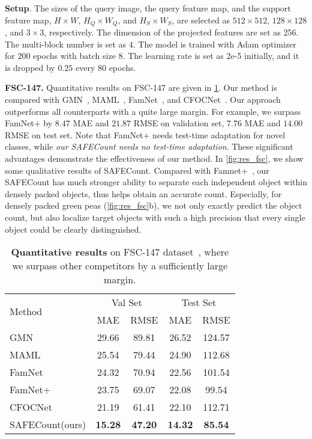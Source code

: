 \documentclass[10pt,twocolumn,letterpaper]{article}
\newcommand{\method}{SAFECount\xspace}
\begin{document}
\vspace{2pt}\noindent \textbf{Setup}. The sizes of the query image, the query feature map, and the support feature map, $H \times W$, $H_Q \times W_Q$, and $H_S \times W_S$, are selected as $512 \times 512$, $128 \times 128$, and $3 \times 3$, respectively. The dimension of the projected features are set as 256. The multi-block number is set as $4$. The model is trained with Adam optimizer~\cite{adam} for $200$ epochs with batch size $8$. The learning rate is set as 2e-5 initially, and it is dropped by $0.25$ every $80$ epochs. 

\vspace{2pt}\noindent \textbf{FSC-147.}  Quantitative results on FSC-147 are given in \cref{tab:res_fsc_147}. Our method is compared with GMN~\cite{gmn}, MAML~\cite{maml}, FamNet~\cite{famnet}, and CFOCNet~\cite{cfocnet}. Our approach outperforms all counterparts with a quite large margin. For example, we surpass FamNet+ by $8.47$ MAE and $21.87$ RMSE on validation set, $7.76$ MAE and $14.00$ RMSE on test set. Note that FamNet+ needs test-time adaptation for novel classes, while \textit{our \method needs no test-time adaptation}. These significant advantages demonstrate the effectiveness of our method. In \cref{fig:res_fsc}, we show some qualitative results of \method. Compared with Famnet+~\cite{famnet}, our \method has much stronger ability to separate each independent object within densely packed objects, thus helps obtain an accurate count. Especially, for densely packed green peas (\cref{fig:res_fsc}b), we not only exactly predict the object count, but also localize target objects with such a high precision that every single object could be clearly distinguished. 


\begin{table}[tb]
\caption{
    \textbf{Quantitative results} on FSC-147 dataset~\cite{famnet}, where we surpass other competitors by a sufficiently large margin. 
}
\setlength\tabcolsep{8pt}
\centering
\scriptsize
\begin{threeparttable}
\begin{tabular}{lcccc}
\toprule
\multirow{2}{*}{Method}
& \multicolumn{2}{c}{Val Set} & \multicolumn{2}{c}{Test Set} \\
\cmidrule{2-5}
& MAE & RMSE & MAE & RMSE \\
\midrule
GMN~\cite{gmn}         & 29.66 & 89.81 & 26.52 & 124.57 \\
MAML~\cite{maml}       & 25.54 & 79.44 & 24.90 & 112.68 \\
FamNet~\cite{famnet}   & 24.32 & 70.94 & 22.56 & 101.54  \\
FamNet+~\cite{famnet}  & 23.75 & 69.07 & 22.08 & 99.54  \\
CFOCNet~\cite{cfocnet} & 21.19 & 61.41 & 22.10 & 112.71 \\
\midrule
\method (ours) & \textbf{15.28} & \textbf{47.20} & \textbf{14.32} & \textbf{85.54} \\
\bottomrule
\end{tabular}
\end{threeparttable}
\label{tab:res_fsc_147}
\vspace{-10pt}
\end{table}
\end{document}
